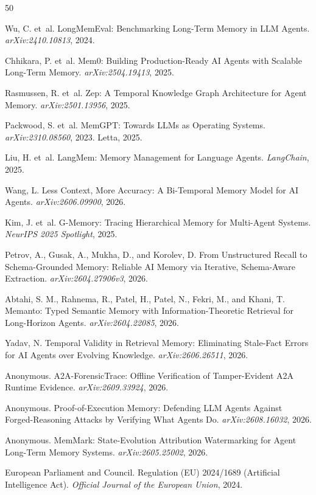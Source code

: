﻿\documentclass{article}
\begin{document}
\begin{thebibliography}{50}

Wu, C. et~al.
\newblock LongMemEval: Benchmarking Long-Term Memory in LLM Agents.
\newblock \emph{arXiv:2410.10813}, 2024.

Chhikara, P. et~al.
\newblock Mem0: Building Production-Ready AI Agents with Scalable Long-Term Memory.
\newblock \emph{arXiv:2504.19413}, 2025.

Rasmussen, R. et~al.
\newblock Zep: A Temporal Knowledge Graph Architecture for Agent Memory.
\newblock \emph{arXiv:2501.13956}, 2025.

Packwood, S. et~al.
\newblock MemGPT: Towards LLMs as Operating Systems.
\newblock \emph{arXiv:2310.08560}, 2023. Letta, 2025.

Liu, H. et~al.
\newblock LangMem: Memory Management for Language Agents.
\newblock \emph{LangChain}, 2025.

Wang, L.
\newblock Less Context, More Accuracy: A Bi-Temporal Memory Model for AI Agents.
\newblock \emph{arXiv:2606.09900}, 2026.

Kim, J. et~al.
\newblock G-Memory: Tracing Hierarchical Memory for Multi-Agent Systems.
\newblock \emph{NeurIPS 2025 Spotlight}, 2025.

Petrov, A., Gusak, A., Mukha, D., and Korolev, D.
\newblock From Unstructured Recall to Schema-Grounded Memory: Reliable AI Memory via Iterative, Schema-Aware Extraction.
\newblock \emph{arXiv:2604.27906v3}, 2026.

Abtahi, S. M., Rahnema, R., Patel, H., Patel, N., Fekri, M., and Khani, T.
\newblock Memanto: Typed Semantic Memory with Information-Theoretic Retrieval for Long-Horizon Agents.
\newblock \emph{arXiv:2604.22085}, 2026.

Yadav, N.
\newblock Temporal Validity in Retrieval Memory: Eliminating Stale-Fact Errors for AI Agents over Evolving Knowledge.
\newblock \emph{arXiv:2606.26511}, 2026.

Anonymous.
\newblock A2A-ForensicTrace: Offline Verification of Tamper-Evident A2A Runtime Evidence.
\newblock \emph{arXiv:2609.33924}, 2026.

Anonymous.
\newblock Proof-of-Execution Memory: Defending LLM Agents Against Forged-Reasoning Attacks by Verifying What Agents Do.
\newblock \emph{arXiv:2608.16032}, 2026.

Anonymous.
\newblock MemMark: State-Evolution Attribution Watermarking for Agent Long-Term Memory Systems.
\newblock \emph{arXiv:2605.25002}, 2026.

European Parliament and Council.
\newblock Regulation (EU) 2024/1689 (Artificial Intelligence Act).
\newblock \emph{Official Journal of the European Union}, 2024.

\end{thebibliography}
\end{document}
